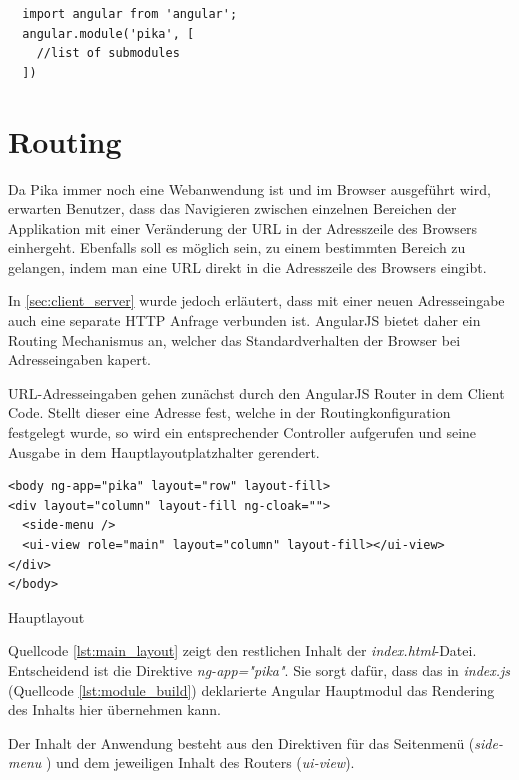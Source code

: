\begin{listing}[H]
\begin{verbatim}
  import angular from 'angular';
  angular.module('pika', [
    //list of submodules
  ])
\end{verbatim}
\end{listing}

\section{Routing}
\label{sec:routing}

Da Pika immer noch eine Webanwendung ist und im Browser ausgeführt wird, erwarten Benutzer, dass das Navigieren zwischen einzelnen Bereichen der Applikation mit einer Veränderung der URL in der Adresszeile des Browsers einhergeht. Ebenfalls soll es möglich sein, zu einem bestimmten Bereich zu gelangen, indem man eine URL direkt in die Adresszeile des Browsers eingibt.

In \ref{sec:client_server} wurde jedoch erläutert, dass mit einer neuen Adresseingabe auch eine separate HTTP Anfrage verbunden ist. AngularJS bietet daher ein Routing Mechanismus an, welcher das Standardverhalten der Browser bei Adresseingaben kapert.

URL-Adresseingaben gehen zunächst durch den AngularJS Router in dem Client Code. Stellt dieser eine Adresse fest, welche in der Routingkonfiguration festgelegt wurde, so wird ein entsprechender Controller aufgerufen und seine Ausgabe in dem Hauptlayoutplatzhalter gerendert.


\begin{listing}[H]
\begin{verbatim}
<body ng-app="pika" layout="row" layout-fill>
<div layout="column" layout-fill ng-cloak="">
  <side-menu />
  <ui-view role="main" layout="column" layout-fill></ui-view>
</div>
</body>
\end{verbatim}
\caption{Hauptlayout}
\label{lst:main_layout}
\end{listing}

Quellcode \ref{lst:main_layout} zeigt den restlichen Inhalt der \emph{index.html}-Datei. Entscheidend ist die Direktive \emph{ng-app="pika"}. Sie sorgt dafür, dass das in \emph{index.js} (Quellcode \ref{lst:module_build}) deklarierte Angular Hauptmodul das Rendering des Inhalts hier übernehmen kann.

Der Inhalt der Anwendung besteht aus den Direktiven für das Seitenmenü (\emph{side-menu} ) und dem jeweiligen Inhalt des Routers (\emph{ui-view}).

